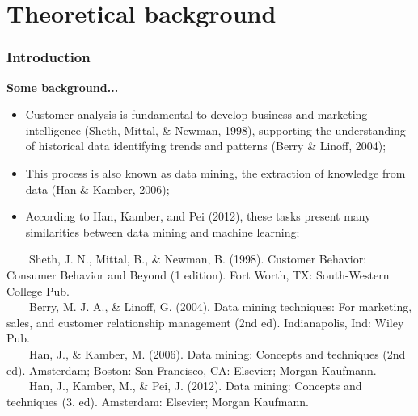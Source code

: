 \documentclass[10pt]{beamer}
\begin{document}
\section{Theoretical background}
\begin{frame}
	\frametitle{Introduction}
	\Large
	\textbf{Some background...}\\
		\begin{itemize} \normalsize
			\item Customer analysis is fundamental to develop business and marketing intelligence \footnotesize(Sheth, Mittal, \& Newman, 1998)\normalsize, supporting the understanding of historical data identifying trends and patterns \footnotesize(Berry \& Linoff, 2004)\normalsize;
			\item This process is also known as data mining, the extraction of knowledge from data \footnotesize(Han \& Kamber, 2006)\normalsize;
			\item According to \footnotesize Han, Kamber, and Pei (2012)\normalsize, these tasks present many similarities between data mining and machine learning;
		\end{itemize}	
	\tiny
	~~~~Sheth, J. N., Mittal, B., \& Newman, B. (1998). Customer Behavior: Consumer Behavior and Beyond (1 edition). Fort Worth, TX: South-Western College Pub. \\
	~~~~Berry, M. J. A., \& Linoff, G. (2004). Data mining techniques: For marketing, sales, and customer relationship management (2nd ed). Indianapolis, Ind: Wiley Pub.\\
	~~~~Han, J., \& Kamber, M. (2006). Data mining: Concepts and techniques (2nd ed). Amsterdam; Boston: San Francisco, CA: Elsevier; Morgan Kaufmann.\\
	~~~~Han, J., Kamber, M., \& Pei, J. (2012). Data mining: Concepts and techniques (3. ed). Amsterdam: Elsevier; Morgan Kaufmann.\\

\end{frame}
\end{document}
